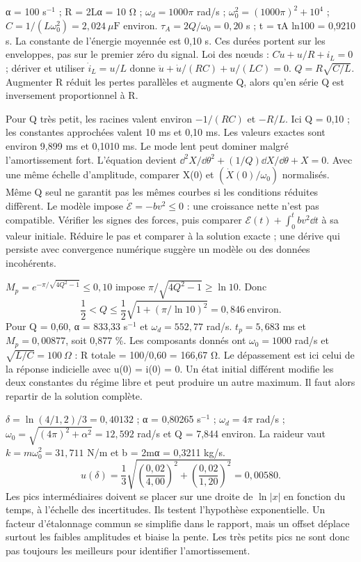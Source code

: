 α = 100 s$^{-1}$ ; R = 2Lα = 10 Ω ; $\omega_d=1000\pi$ rad/s ; $\omega_0^2=(1000\pi)^2+10^4$ ; $C=1/(L\omega_0^2)=2{,}024\ \mu\mathrm{ F}$ environ.
$\tau_A=2Q/\omega_0=0{,}20$ s ; t = τA ln100 = 0,9210 s. La constante de l’énergie moyennée est 0,10 s. Ces durées portent sur les enveloppes, pas sur le premier zéro du signal.
Loi des nœuds : $C\dot u+u/R+i_L=0$ ; dériver et utiliser $\dot i_L=u/L$ donne $\ddot u+\dot u/(RC)+u/(LC)=0$. $Q=R\sqrt{C/L}$. Augmenter R réduit les pertes parallèles et augmente Q, alors qu’en série Q est inversement proportionnel à R.


Pour Q très petit, les racines valent environ $-1/(RC)$ et $-R/L$. Ici Q = 0,10 ; les constantes approchées valent 10 ms et 0,10 ms. Les valeurs exactes sont environ 9,899 ms et 0,1010 ms. Le mode lent peut dominer malgré l’amortissement fort.
L’équation devient $\dd^2X/\dd\theta^2+(1/Q)\dd X/\dd\theta+X=0$. Avec une même échelle d’amplitude, comparer X(0) et $(\dot X(0)/\omega_0)$ normalisés. Même Q seul ne garantit pas les mêmes courbes si les conditions réduites diffèrent.
Le modèle impose $\dot{\mathcal E}=-bv^2\leq0$ : une croissance nette n’est pas compatible. Vérifier les signes des forces, puis comparer $\mathcal E(t)+\int_0^t bv^2\dd t$ à sa valeur initiale. Réduire le pas et comparer à la solution exacte ; une dérive qui persiste avec convergence numérique suggère un modèle ou des données incohérents.


$M_p=e^{-\pi/\sqrt{4Q^2-1}}\leq0{,}10$ impose $\pi/\sqrt{4Q^2-1}\geq\ln10$. Donc
\[\frac12<Q\leq\frac12\sqrt{1+(\pi/\ln10)^2}=0{,}846\ \text{environ}.\]
Pour Q = 0,60, α = 833,33 s$^{-1}$ et $\omega_d=552{,}77$ rad/s. $t_p=5{,}683$ ms et $M_p=0{,}00877$, soit 0,877 \%. Les composants donnés ont $\omega_0=1000$ rad/s et $\sqrt{L/C}=100\ \Omega$ : R totale = 100/0,60 = 166,67 Ω.
Le dépassement est ici celui de la réponse indicielle avec u(0) = i(0) = 0. Un état initial différent modifie les deux constantes du régime libre et peut produire un autre maximum. Il faut alors repartir de la solution complète.


$\delta=\ln(4/1{,}2)/3=0{,}40132$ ; α = 0,80265 s$^{-1}$ ; $\omega_d=4\pi$ rad/s ; $\omega_0=\sqrt{(4\pi)^2+\alpha^2}=12{,}592$ rad/s et Q = 7,844 environ.
La raideur vaut $k=m\omega_0^2=31{,}711$ N/m et b = 2mα = 0,3211 kg/s.
\[u(\delta)=\frac13\sqrt{\left(\frac{0{,}02}{4{,}00}\right)^2+\left(\frac{0{,}02}{1{,}20}\right)^2}=0{,}00580.\]
Les pics intermédiaires doivent se placer sur une droite de $\ln|x|$ en fonction du temps, à l’échelle des incertitudes. Ils testent l’hypothèse exponentielle. Un facteur d’étalonnage commun se simplifie dans le rapport, mais un offset déplace surtout les faibles amplitudes et biaise la pente. Les très petits pics ne sont donc pas toujours les meilleurs pour identifier l’amortissement.


